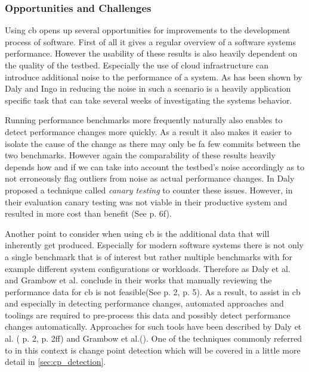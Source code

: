 \documentclass[	runningheads,
				a4paper]{llncs}
\begin{document}
		\subsubsection{Opportunities and Challenges}
		\label{sssec:cd_challenges}

		Using \gls{cb} opens up several opportunities for improvements to the development process of software. First of all it gives a regular overview of a software systems performance. However the usability of these results is also heavily dependent on the quality of the testbed. Especially the use of cloud infrastructure can introduce additional noise to the performance of a system. As has been shown by Daly and Ingo in \cite{daly2019} reducing the noise in such a scenario is a heavily application specific task that can take several weeks of investigating the systems behavior.

	Running performance benchmarks more frequently naturally also enables to detect performance changes more quickly. As a result it also makes it easier to isolate the cause of the change as there may only be fa few commits between the two benchmarks. However again the comparability of these results heavily depends how and if we can take into account the testbed's noise accordingly as to not erroneously flag outliers from noise as actual performance changes. In \cite{daly2021} Daly proposed a technique called \textit{canary testing} to counter these issues. However, in their evaluation canary testing was not viable in their productive system and resulted in more cost than benefit (See \cite{daly2021} p. 6f).

	Another point to consider when using \gls{cb} is the additional data that will inherently get produced. Especially for modern software systems there is not only a single benchmark that is of interest but rather multiple benchmarks with for example different system configurations or workloads. Therefore as Daly et al. and Grambow et al. conclude in their works that manually reviewing the performance data for \gls{cb} is not feasible(See \cite{daly2020} p. 2, \cite{grambow2019} p. 5). As a result, to assist in \gls{cb} and especially in detecting performance changes, automated approaches and toolings are required to pre-process this data and possibly detect performance changes automatically. Approaches for such tools have been described by Daly et al. (\cite{daly2020} p. 2, \cite{daly2021} p. 2ff) and Grambow et al.(\cite{grambow2019}). One of the techniques commonly referred to in this context is change point detection which will be covered in a little more detail in \autoref{sec:cp_detection}.
\end{document}

